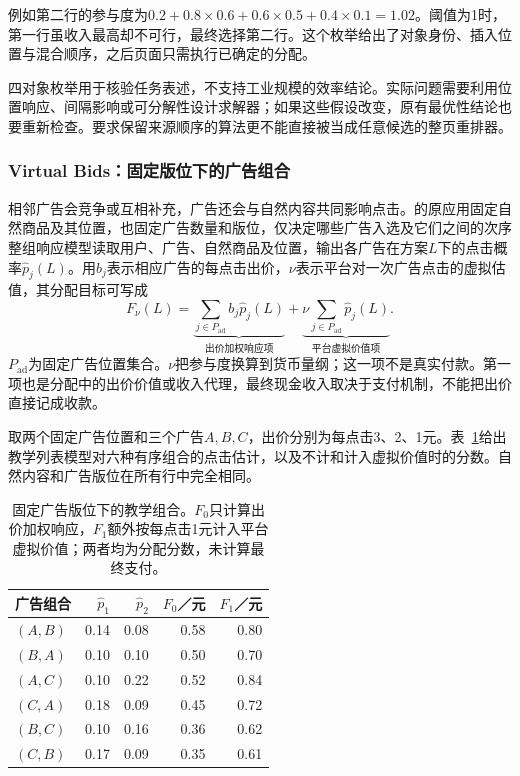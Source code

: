 例如第二行的参与度为$0.2+0.8\times0.6+0.6\times0.5+0.4\times0.1=1.02$。阈值为1时，第一行虽收入最高却不可行，最终选择第二行。这个枚举给出了对象身份、插入位置与混合顺序，之后页面只需执行已确定的分配。

四对象枚举用于核验任务表述，不支持工业规模的效率结论。实际问题需要利用位置响应、间隔影响或可分解性设计求解器；如果这些假设改变，原有最优性结论也要重新检查。要求保留来源顺序的算法更不能直接被当成任意候选的整页重排器。

\subsubsection{Virtual Bids：固定版位下的广告组合}
\label{sec:rs-virtual-bids}

相邻广告会竞争或互相补充，广告还会与自然内容共同影响点击。的原应用固定自然商品及其位置，也固定广告数量和版位，仅决定哪些广告入选及它们之间的次序整组响应模型读取用户、广告、自然商品及位置，输出各广告在方案$L$下的点击概率$\widehat p_j(L)$。用$b_j$表示相应广告的每点击出价，$\nu$表示平台对一次广告点击的虚拟估值，其分配目标可写成
\begin{equation}
 F_\nu(L)
 =\underbrace{\sum_{j\in P_{\mathrm{ad}}}b_j\widehat p_j(L)}
              _{\text{出价加权响应项}}
  +\underbrace{\nu\sum_{j\in P_{\mathrm{ad}}}\widehat p_j(L)}
              _{\text{平台虚拟价值项}}.
 \label{eq:rs-virtual-bids}
\end{equation}
$P_{\mathrm{ad}}$为固定广告位置集合。$\nu$把参与度换算到货币量纲；这一项不是真实付款。第一项也是分配中的出价价值或收入代理，最终现金收入取决于支付机制，不能把出价直接记成收款。

取两个固定广告位置和三个广告$A,B,C$，出价分别为每点击3、2、1元。表~\ref{tab:rs-virtual-bids-example}给出教学列表模型对六种有序组合的点击估计，以及不计和计入虚拟价值时的分数。自然内容和广告版位在所有行中完全相同。

\begin{table}[htbp]
 \centering\small
 \begin{tabular}{@{}lrrrr@{}}
  \toprule
  广告组合 & $\widehat p_1$ & $\widehat p_2$ & $F_0$／元 & $F_1$／元\\
  \midrule
  $(A,B)$ & 0.14 & 0.08 & 0.58 & 0.80\\
  $(B,A)$ & 0.10 & 0.10 & 0.50 & 0.70\\
  $(A,C)$ & 0.10 & 0.22 & 0.52 & 0.84\\
  $(C,A)$ & 0.18 & 0.09 & 0.45 & 0.72\\
  $(B,C)$ & 0.10 & 0.16 & 0.36 & 0.62\\
  $(C,B)$ & 0.17 & 0.09 & 0.35 & 0.61\\
  \bottomrule
 \end{tabular}
 \caption{固定广告版位下的教学组合。$F_0$只计算出价加权响应，$F_1$额外按每点击1元计入平台虚拟价值；两者均为分配分数，未计算最终支付。}
 \label{tab:rs-virtual-bids-example}
\end{table}


